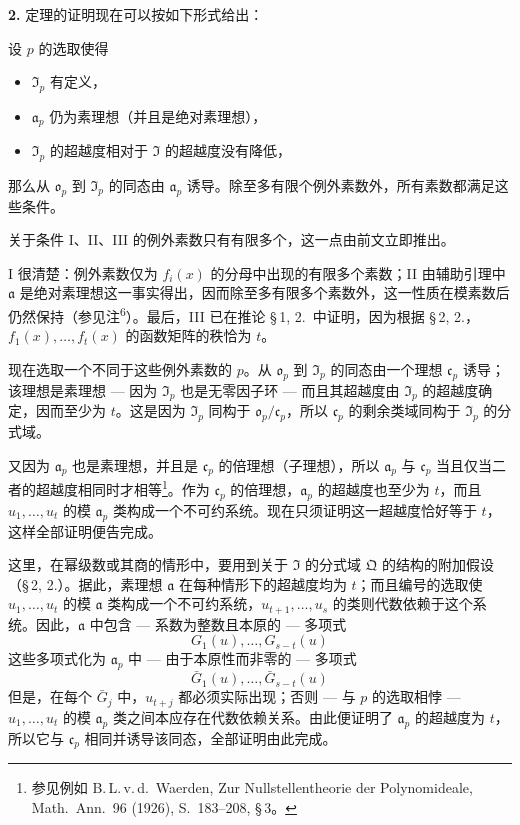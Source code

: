 \medskip\noindent\textbf{2.}
定理的证明现在可以按如下形式给出：

设 $p$ 的选取使得
\begin{itemize}
\item[I.] $\mathfrak{I}_p$ 有定义，
\item[II.] $\mathfrak{a}_p$ 仍为素理想（并且是绝对素理想），
\item[III.] $\mathfrak{I}_p$ 的超越度相对于 $\mathfrak{I}$ 的超越度没有降低，
\end{itemize}
那么从 $\mathfrak{o}_p$ 到 $\mathfrak{I}_p$ 的同态由 $\mathfrak{a}_p$ 诱导。除至多有限个例外素数外，所有素数都满足这些条件。

关于条件 I、II、III 的例外素数只有有限多个，这一点由前文立即推出。

I 很清楚：例外素数仅为 $f_i(x)$ 的分母中出现的有限多个素数；II 由辅助引理中 $\mathfrak{a}$ 是绝对素理想这一事实得出，因而除至多有限多个素数外，这一性质在模素数后仍然保持（参见注\textsuperscript{6}）。最后，III 已在推论 \S\,1, 2.\ 中证明，因为根据 \S\,2, 2.，$f_1(x),\ldots,f_t(x)$ 的函数矩阵的秩恰为 $t$。

现在选取一个不同于这些例外素数的 $p$。从 $\mathfrak{o}_p$ 到 $\mathfrak{I}_p$ 的同态由一个理想 $\mathfrak{c}_p$ 诱导；该理想是素理想 --- 因为 $\mathfrak{I}_p$ 也是无零因子环 --- 而且其超越度由 $\mathfrak{I}_p$ 的超越度确定，因而至少为 $t$。这是因为 $\mathfrak{I}_p$ 同构于 $\mathfrak{o}_p/\mathfrak{c}_p$，所以 $\mathfrak{c}_p$ 的剩余类域同构于 $\mathfrak{I}_p$ 的分式域。

又因为 $\mathfrak{a}_p$ 也是素理想，并且是 $\mathfrak{c}_p$ 的倍理想（子理想），所以 $\mathfrak{a}_p$ 与 $\mathfrak{c}_p$ 当且仅当二者的超越度相同时才相等\footnote{参见例如 B.\,L.\,v.\,d.\ Waerden, Zur Nullstellentheorie der Polynomideale, Math.\ Ann.\ 96 (1926), S.\ 183--208, \S\,3。}。作为 $\mathfrak{c}_p$ 的倍理想，$\mathfrak{a}_p$ 的超越度也至少为 $t$，而且 $u_1,\ldots,u_t$ 的模 $\mathfrak{a}_p$ 类构成一个不可约系统。现在只须证明这一超越度恰好等于 $t$，这样全部证明便告完成。

这里，在幂级数或其商的情形中，要用到关于 $\mathfrak{I}$ 的分式域 $\mathfrak{Q}$ 的结构的附加假设（\S\,2, 2.）。据此，素理想 $\mathfrak{a}$ 在每种情形下的超越度均为 $t$；而且编号的选取使 $u_1,\ldots,u_t$ 的模 $\mathfrak{a}$ 类构成一个不可约系统，$u_{t+1},\ldots,u_s$ 的类则代数依赖于这个系统。因此，$\mathfrak{a}$ 中包含 --- 系数为整数且本原的 --- 多项式
\[
G_1(u),\ldots,G_{s-t}(u)\tag{1}
\]
这些多项式化为 $\mathfrak{a}_p$ 中 --- 由于本原性而非零的 --- 多项式
\[
\bar{G}_1(u),\ldots,\bar{G}_{s-t}(u)\tag{2}
\]
但是，在每个 $\bar{G}_j$ 中，$u_{t+j}$ 都必须实际出现；否则 --- 与 $p$ 的选取相悖 --- $u_1,\ldots,u_t$ 的模 $\mathfrak{a}_p$ 类之间本应存在代数依赖关系。由此便证明了 $\mathfrak{a}_p$ 的超越度为 $t$，所以它与 $\mathfrak{c}_p$ 相同并诱导该同态，全部证明由此完成。

